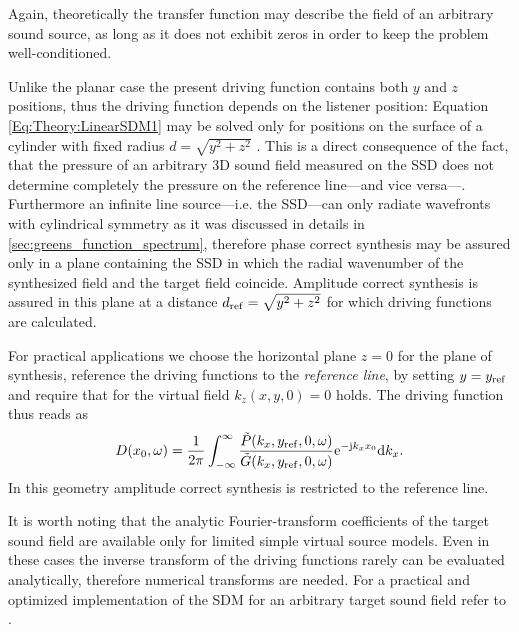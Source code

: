 Again, theoretically the transfer function may describe the field of an arbitrary sound source, as long as it does not exhibit zeros in order to keep the problem well-conditioned.

\vspace{3mm}
Unlike the planar case the present driving function contains both $y$ and $z$ positions, thus the driving function depends on the listener position: Equation \eqref{Eq:Theory:LinearSDM1} may be solved only for positions on the surface of a cylinder with fixed radius $d = \sqrt{y^2 + z^2}$ \cite[p.~60.]{Ahrens2010phd}.
This is a direct consequence of the fact, that the pressure of an arbitrary 3D sound field measured on the SSD does not determine completely the pressure on the reference line---and vice versa---.
Furthermore an infinite line source---i.e. the SSD---can only radiate wavefronts with cylindrical symmetry as it was discussed in details in \ref{sec:greens_function_spectrum},
therefore phase correct synthesis may be assured only in a plane containing the SSD in which the radial wavenumber of the synthesized field and the target field coincide. 
Amplitude correct synthesis is assured in this plane at a distance $d_{\mathrm{ref}} = \sqrt{y^2 + z^2}$ for which driving functions are calculated.

For practical applications we choose the horizontal plane $z=0$ for the plane of synthesis, reference the driving functions to the \emph{reference line}, by setting $y = y_{\mathrm{ref}}$ and require that for the virtual field $k_z(x,y,0) = 0$ holds.
The driving function thus reads as
\begin{equation}
D(x_0,\omega) = \frac{1}{2\pi} \int_{-\infty}^{\infty} \frac{\tilde{P}(k_x,y_{\mathrm{ref}},0, \omega) }{\tilde{G}(k_x,y_{\mathrm{ref}},0, \omega)} \mathrm{e}^{-\mathrm{j} k_x x_0} \mathrm{d} k_x.
\label{Eq:Theory:Linear_SDM}
\end{equation}
In this geometry amplitude correct synthesis is restricted to the reference line.

\vspace{3mm}
It is worth noting that the analytic Fourier-transform coefficients of the target sound field are available only for limited simple virtual source models. 
Even in these cases the inverse transform of the driving functions rarely can be evaluated analytically, therefore numerical transforms are needed.
For a practical and optimized implementation of the SDM for an arbitrary target sound field refer to \cite{ahrens2013a:efficientSDM}.


